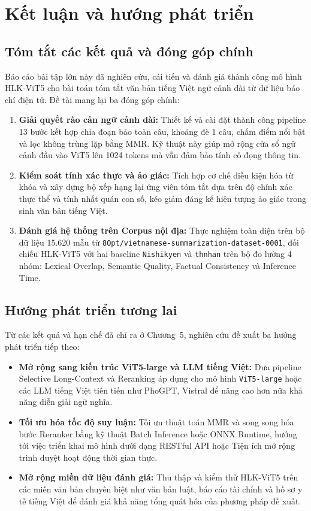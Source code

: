 \chapter{Kết luận và hướng phát triển}
\label{ch:conclusion}

\section{Tóm tắt các kết quả và đóng góp chính}

Báo cáo bài tập lớn này đã nghiên cứu, cải tiến và đánh giá thành công mô hình HLK-ViT5 cho bài toán tóm tắt văn bản tiếng Việt ngữ cảnh dài từ dữ liệu báo chí điện tử. Đề tài mang lại ba đóng góp chính:

\begin{enumerate}[label=\arabic*.]
  \item \textbf{Giải quyết rào cản ngữ cảnh dài:} Thiết kế và cài đặt thành công pipeline 13 bước kết hợp chia đoạn bảo toàn câu, khoảng đè 1 câu, chấm điểm nổi bật và lọc không trùng lặp bằng MMR. Kỹ thuật này giúp mở rộng cửa sổ ngữ cảnh đầu vào ViT5 lên 1024 tokens mà vẫn đảm bảo tính cô đọng thông tin.
  \item \textbf{Kiểm soát tính xác thực và ảo giác:} Tích hợp cơ chế điều kiện hóa từ khóa và xây dựng bộ xếp hạng lại ứng viên tóm tắt dựa trên độ chính xác thực thể và tính nhất quán con số, kéo giảm đáng kể hiện tượng ảo giác trong sinh văn bản tiếng Việt.
  \item \textbf{Đánh giá hệ thống trên Corpus nội địa:} Thực nghiệm toàn diện trên bộ dữ liệu 15.620 mẫu từ \texttt{8Opt/vietnamese-summarization-dataset-0001}, đối chiếu HLK-ViT5 với hai baseline \texttt{Nishikyen} và \texttt{thnhan} trên bộ đo lường 4 nhóm: Lexical Overlap, Semantic Quality, Factual Consistency và Inference Time.
\end{enumerate}

\section{Hướng phát triển tương lai}

Từ các kết quả và hạn chế đã chỉ ra ở Chương~5, nghiên cứu đề xuất ba hướng phát triển tiếp theo:

\begin{itemize}
  \item \textbf{Mở rộng sang kiến trúc ViT5-large và LLM tiếng Việt:} Đưa pipeline Selective Long-Context và Reranking áp dụng cho mô hình \texttt{ViT5-large} hoặc các LLM tiếng Việt tiên tiến như PhoGPT, Vistral để nâng cao hơn nữa khả năng diễn giải ngữ nghĩa.
  \item \textbf{Tối ưu hóa tốc độ suy luận:} Tối ưu thuật toán MMR và song song hóa bước Reranker bằng kỹ thuật Batch Inference hoặc ONNX Runtime, hướng tới việc triển khai mô hình dưới dạng RESTful API hoặc Tiện ích mở rộng trình duyệt hoạt động thời gian thực.
  \item \textbf{Mở rộng miền dữ liệu đánh giá:} Thu thập và kiểm thử HLK-ViT5 trên các miền văn bản chuyên biệt như văn bản luật, báo cáo tài chính và hồ sơ y tế tiếng Việt để đánh giá khả năng tổng quát hóa của phương pháp đề xuất.
\end{itemize}

\vspace{0.6em}
